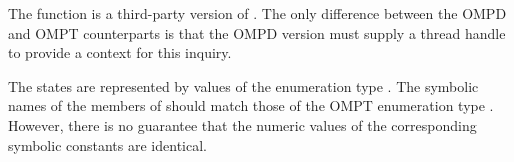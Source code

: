 \descr
The function  is a  third-party version of
. 
The only difference between the OMPD and OMPT counterparts
is that the OMPD version must supply a thread handle to provide
a context for this inquiry.

\argdesc
The states are represented by values of the enumeration type
.
The symbolic names of the members of  should
match those of the OMPT enumeration type .
However, there is no guarantee that the numeric values of the corresponding
symbolic constants are identical.

\crossreferences
